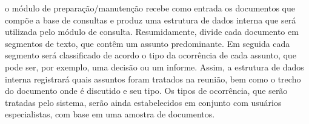 










 




















o módulo de preparação/manutenção recebe como entrada os documentos que compõe a base de consultas e produz uma estrutura de dados interna que será utilizada pelo módulo de consulta. Resumidamente, divide cada documento em segmentos de texto, que contêm um assunto predominante. Em seguida cada segmento será classificado de acordo o tipo da ocorrência de cada assunto, que pode ser, por exemplo, uma decisão ou um informe. Assim, a estrutura de dados interna registrará quais assuntos foram tratados na reunião, bem como o trecho do documento onde é discutido e seu tipo. Os tipos de ocorrência, que serão tratadas pelo sistema, serão ainda estabelecidos em conjunto com usuários especialistas, com base em uma amostra de documentos.

